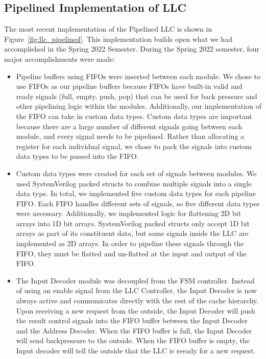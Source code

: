 \documentclass{sig-alternate}
\begin{document}
\subsection{Pipelined Implementation of LLC} %
The most recent implementation of the Pipelined LLC is shown in Figure~\ref{fig:llc_pipelined}. This implementation builds open what we had accomplished in the Spring 2022 Semester. During the Spring 2022 semester, 
four major accomplishments were made:
\begin{itemize}
  \item Pipeline buffers using FIFOs were inserted between each module. We chose to use FIFOs as our pipeline buffers because
  FIFOs have built-in valid and ready signals (full, empty, push, pop) that can be used for back pressure and other pipelining logic within the 
  modules. Additionally, our implementation of the FIFO can take in custom data types. Custom data types are important because there are a large number 
  of different signals going between each module, and every signal needs to be pipelined. Rather than allocating a register for each individual signal, 
  we chose to pack the signals into custom data types to be passed into the FIFO.
  \item Custom data types were created for each set of signals between modules. We used SystemVerilog packed structs to combine multiple signals into a single data type. In total, 
  we implemented five custom data types for each pipeline FIFO. Each FIFO handles different sets of signals, so five different data types were necessary. Additionally, 
  we implemented logic for flattening 2D bit arrays into 1D bit arrays. SystemVerilog packed structs only accept 1D bit arrays as part of its constituent data, but some signals inside the LLC 
  are implemented as 2D arrays. In order to pipeline these signals through the FIFO, they must be flatted and un-flatted at the input and output of the FIFO.
  \item The Input Decoder module was decoupled from the FSM controller. Instead of using an enable signal from the LLC Controller, the Input Decoder is now always active and communicates directly with the rest of the cache
   hierarchy. Upon receiving a new request from the outside, the Input Decoder will push the result control signals into the FIFO buffer between the Input Decoder and the Address Decoder. When the FIFO buffer is full,
   the Input Decoder will send backpressure to the outside. When the FIFO buffer is empty, the Input decoder will tell the outside that the LLC is reeady for a new request.

\end{itemize}
\end{document}
